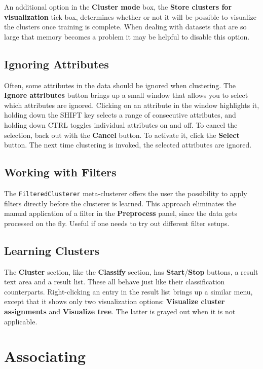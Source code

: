 An additional option in the \textbf{Cluster mode} box, the \textbf{Store
clusters for visualization} tick box, determines whether or not it will be
possible to visualize the clusters once training is complete. When dealing
with datasets that are so large that memory becomes a problem it may be
helpful to disable this option.

\subsection{Ignoring Attributes}

Often, some attributes in the data should be ignored when clustering.  The
\textbf{Ignore attributes} button brings up a small window that allows you to
select which attributes are ignored.  Clicking on an attribute in the window
highlights it, holding down the SHIFT key selects a range of consecutive
attributes, and holding down CTRL toggles individual attributes on and off. To
cancel the selection, back out with the \textbf{Cancel} button. To activate it,
click the \textbf{Select} button. The next time clustering is invoked, the
selected attributes are ignored.

\subsection{Working with Filters}

The \texttt{FilteredClusterer} meta-clusterer offers the user the possibility 
to apply filters directly before the clusterer is learned. This approach
eliminates the manual application of a filter in the \textbf{Preprocess} panel,
since the data gets processed on the fly. Useful if one needs to try out 
different filter setups.

\subsection{Learning Clusters}

The \textbf{Cluster} section, like the \textbf{Classify} section, has
\textbf{Start}/\textbf{Stop} buttons, a result text area and a result
list. These all behave just like their classification counterparts.
Right-clicking an entry in the result list brings up a similar menu,
except that it shows only two visualization options: \textbf{Visualize
cluster assignments} and \textbf{Visualize tree}. The latter is grayed
out when it is not applicable.

\newpage

\section{Associating}

